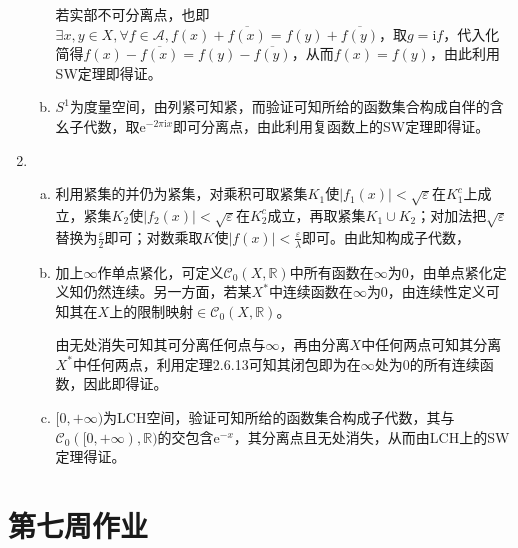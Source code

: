\documentclass[a4paper,UTF8,fontset=windows]{ctexart}
\begin{document}
\begin{enumerate}[(1)]
\begin{enumerate}[(a)]
    若实部不可分离点，也即$\exists x,y\in X,\forall f\in\mathcal{A},f(x)+\overline{f(x)}=f(y)+\overline{f(y)}$，取$g=\mathrm{i}f$，代入化简得$f(x)-\overline{f(x)}=f(y)-\overline{f(y)}$，从而$f(x)=f(y)$，由此利用SW定理即得证。
    
    \item
    $S^1$为度量空间，由列紧可知紧，而验证可知所给的函数集合构成自伴的含幺子代数，取$\mathrm{e}^{-2\pi\mathrm{i}x}$即可分离点，由此利用复函数上的SW定理即得证。
    \end{enumerate}
    
    \item
    \begin{enumerate}[(a)]
    \item
    利用紧集的并仍为紧集，对乘积可取紧集$K_1$使$|f_1(x)|<\sqrt\varepsilon$在$K_1^c$上成立，紧集$K_2$使$|f_2(x)|<\sqrt\varepsilon$在$K_2^c$成立，再取紧集$K_1\cup K_2$；对加法把$\sqrt\varepsilon$替换为$\frac{\varepsilon}{2}$即可；对数乘取$K$使$|f(x)|<\frac{\varepsilon}{\lambda}$即可。由此知构成子代数，
    
    \item
    加上$\infty$作单点紧化，可定义$\mathcal{C}_0(X,\mathbb{R})$中所有函数在$\infty$为0，由单点紧化定义知仍然连续。另一方面，若某$X^*$中连续函数在$\infty$为0，由连续性定义可知其在$X$上的限制映射$\in\mathcal{C}_0(X,\mathbb{R})$。
    
    由无处消失可知其可分离任何点与$\infty$，再由分离$X$中任何两点可知其分离$X^*$中任何两点，利用定理2.6.13可知其闭包即为在$\infty$处为0的所有连续函数，因此即得证。
    
    \item
    $[0,+\infty)$为LCH空间，验证可知所给的函数集合构成子代数，其与$\mathcal{C}_0([0,+\infty),\mathbb{R})$的交包含$\mathrm{e}^{-x}$，其分离点且无处消失，从而由LCH上的SW定理得证。
    \end{enumerate}
\end{enumerate}

\section{第七周作业}
\end{document}
